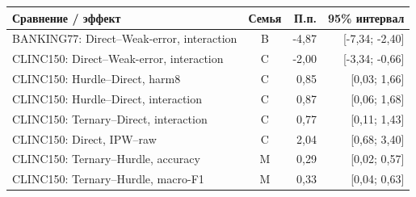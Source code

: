 \begin{tabular}{lcrr}
\toprule
Сравнение / эффект & Семья & П.п. & 95\% интервал \\
\midrule
BANKING77: Direct--Weak-error, interaction & B & -4{,}87 & [-7{,}34; -2{,}40] \\
CLINC150: Direct--Weak-error, interaction & C & -2{,}00 & [-3{,}34; -0{,}66] \\
CLINC150: Hurdle--Direct, harm8 & C & 0{,}85 & [0{,}03; 1{,}66] \\
CLINC150: Hurdle--Direct, interaction & C & 0{,}87 & [0{,}06; 1{,}68] \\
CLINC150: Ternary--Direct, interaction & C & 0{,}77 & [0{,}11; 1{,}43] \\
CLINC150: Direct, IPW--raw & C & 2{,}04 & [0{,}68; 3{,}40] \\
CLINC150: Ternary--Hurdle, accuracy & M & 0{,}29 & [0{,}02; 0{,}57] \\
CLINC150: Ternary--Hurdle, macro-F1 & M & 0{,}33 & [0{,}04; 0{,}63] \\
\bottomrule
\end{tabular}
